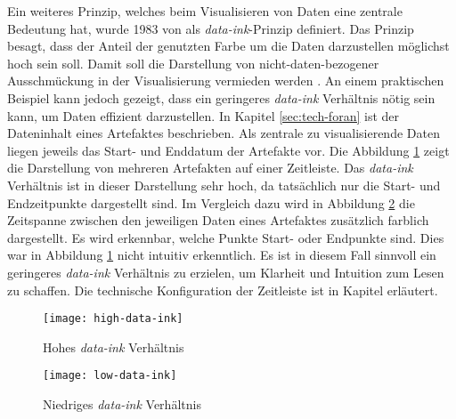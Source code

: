 \par Ein weiteres Prinzip, welches beim Visualisieren von Daten eine zentrale Bedeutung hat, wurde 1983 von \citeauthor{tufteBookReviewsVisual1984} als \textit{data-ink}-Prinzip definiert. Das Prinzip besagt, dass der Anteil der genutzten Farbe um die Daten darzustellen möglichst hoch sein soll. Damit soll die Darstellung von nicht-daten-bezogener \glqq Ausschmückung \grqq in der Visualisierung vermieden werden \autocite{tufteBookReviewsVisual1984}. An einem praktischen Beispiel kann jedoch gezeigt, dass ein geringeres \textit{data-ink} Verhältnis nötig sein kann, um Daten effizient darzustellen. In Kapitel \ref{sec:tech-foran} ist der Dateninhalt eines Artefaktes beschrieben. Als zentrale zu visualisierende Daten liegen jeweils das Start- und Enddatum der Artefakte vor. Die Abbildung \ref{fig:high-data-ink} zeigt die Darstellung von mehreren Artefakten auf einer Zeitleiste. Das \textit{data-ink} Verhältnis ist in dieser Darstellung sehr hoch, da tatsächlich nur die Start- und Endzeitpunkte dargestellt sind. Im Vergleich dazu wird in Abbildung \ref{fig:low-data-ink} die Zeitspanne zwischen den jeweiligen Daten eines Artefaktes zusätzlich farblich dargestellt. Es wird erkennbar, welche Punkte Start- oder Endpunkte sind. Dies war in Abbildung \ref{fig:high-data-ink} nicht intuitiv erkenntlich. Es ist in diesem Fall sinnvoll ein geringeres \textit{data-ink} Verhältnis zu erzielen, um Klarheit und Intuition zum Lesen zu schaffen. Die technische Konfiguration der Zeitleiste ist in Kapitel  erläutert.
%
\begin{figure}
    \centering
    \texttt{[image: high-data-ink]}
    \caption{Hohes \textit{data-ink} Verhältnis}
    \label{fig:high-data-ink}
\end{figure}
%
\begin{figure}
    \centering
    \texttt{[image: low-data-ink]}
    \caption{Niedriges \textit{data-ink} Verhältnis}
    \label{fig:low-data-ink}
\end{figure}
%
